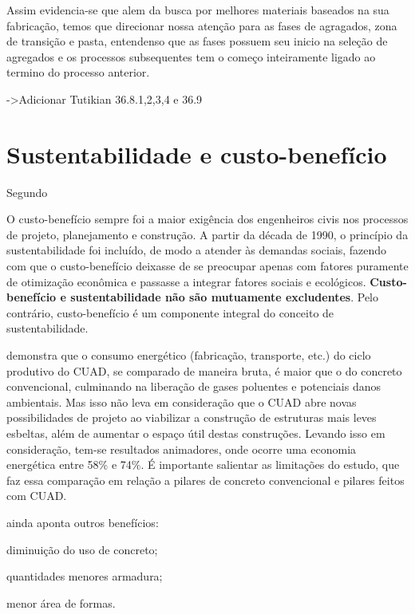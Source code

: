 Assim evidencia-se que alem da busca por melhores materiais baseados na sua fabricação, temos que direcionar nossa atenção para as fases de agragados, zona de transição e pasta, entendenso que as fases possuem seu inicio na seleção de agregados e os processos subsequentes tem o começo inteiramente ligado ao termino do processo anterior. 
 
->Adicionar Tutikian 36.8.1,2,3,4 e 36.9


\section{Sustentabilidade e custo-benefício}

Segundo 

\begin{citacao}
O custo-benefício sempre foi a maior exigência dos engenheiros civis nos processos de projeto, planejamento e construção. A partir da década de 1990, o princípio da sustentabilidade foi incluído, de modo a atender às demandas sociais, fazendo com que o custo-benefício deixasse de se preocupar apenas com fatores puramente de otimização econômica e passasse a integrar fatores sociais e ecológicos. \textbf{Custo-benefício e sustentabilidade não são mutuamente excludentes}. Pelo contrário, custo-benefício é um componente integral do conceito de sustentabilidade.
\end{citacao}

 demonstra que o consumo energético (fabricação, transporte, etc.) do ciclo produtivo do CUAD, se comparado de maneira bruta, é maior que o do concreto convencional, culminando na liberação de gases poluentes e potenciais danos ambientais. Mas isso não leva em consideração que o CUAD abre novas possibilidades de projeto ao viabilizar a construção de estruturas mais leves esbeltas, além de aumentar o espaço útil destas construções. Levando isso em consideração, tem-se resultados animadores, onde ocorre uma economia energética entre 58\% e 74\%. É importante salientar as limitações do estudo, que faz essa comparação em relação a pilares de concreto convencional e pilares feitos com CUAD.

 ainda aponta outros benefícios:

\begin{alineas}[label=\textbullet]
  \item diminuição do uso de concreto;
  \item quantidades menores armadura;
  \item menor área de formas.
\end{alineas}

